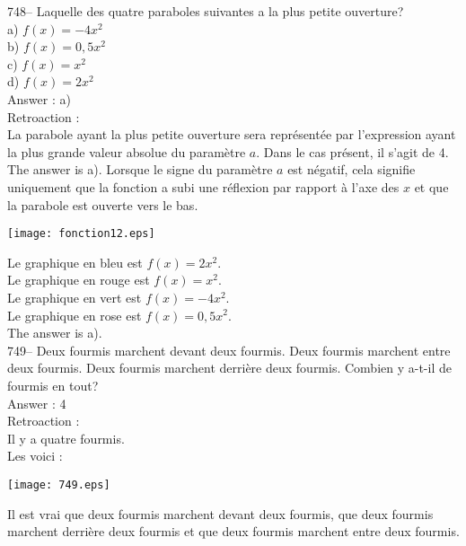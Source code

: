 ﻿\documentclass[letterpaper, 12pt]{article}
\begin{document}
748-- Laquelle des quatre paraboles suivantes a la plus petite ouverture?\\
a) $f(x)=-4x^{2}$\\
b) $f(x)=0,5x^{2}$\\
c) $f(x)=x^{2}$\\
d) $f(x)=2x^{2}$\\

Answer : a)\\

Retroaction : \\
La parabole ayant la plus petite ouverture sera repr\'esent\'ee par
l'expression ayant la plus grande valeur absolue du param\`etre $a$. Dans le
cas pr\'esent, il s'agit de 4. The answer is a). Lorsque le signe du
param\`etre $a$ est n\'egatif, cela signifie uniquement que la fonction a
subi une r\'eflexion par rapport \`a l'axe des $x$ et que la parabole est
ouverte vers le bas.\\
    \begin{center}
    \texttt{[image: fonction12.eps]}
    \end{center}


Le graphique en bleu est $f(x)=2x^{2}$.\\
Le graphique en rouge est $f(x)=x^{2}$.\\
Le graphique en vert est $f(x)=-4x^{2}$.\\
Le graphique en rose est $f(x)=0,5x^{2}$.\\
The answer is a).\\


749-- Deux fourmis marchent devant deux fourmis.  Deux fourmis marchent
entre deux fourmis.  Deux fourmis marchent derri\`ere deux fourmis.  Combien
y a-t-il de fourmis en tout?\\


Answer : 4\\

Retroaction :\\
Il y a quatre fourmis.\\
Les voici :\\
\begin{center}
\texttt{[image: 749.eps]}
\end{center}

Il est vrai que deux fourmis marchent devant deux fourmis, que deux fourmis
marchent derri\`ere deux fourmis et que deux fourmis marchent entre deux
fourmis. \\
\end{document}
